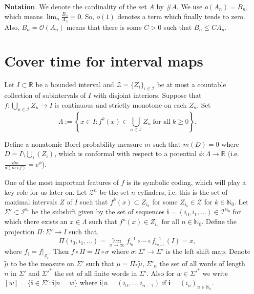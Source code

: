 \documentclass[11pt, reqno]{amsart}
\theoremstyle{plain}%
\theoremstyle{definition}
\theoremstyle{definition}
\def\R{\ensuremath{\mathbb R}}
\def\N{\ensuremath{\mathbb N}}
\def\st{such that }
\numberwithin{equation}{section}
\begin{document}
\textbf{Notation}. We denote the cardinality of the set $A$ by $\#A$. We use $o(A_n)=B_n$, which means $\lim_n \frac{B_n}{A_n}=0$. So, $o(1)$ denotes a term which finally tends to zero. Also, $B_n=\mathcal{O}(A_n)$ means that there is some $C>0$ \st $B_n\le C A_n$. 

\section{Cover time for interval maps} \label{Subsection: Cover time on Interval Maps}
Let $I\subset \R$ be a bounded interval and $\mathcal{Z}=\{Z_i\}_{i\in \mathcal{I}}$ be at most a countable collection of subintervals of $I$ with disjoint interiors. Suppose that $f:\bigcup_{n\in \mathcal{I}}Z_n\to I$ is continuous and strictly monotone on each $Z_n$. Set $$\Lambda := \left\{x \in I : f^k(x) \in \bigcup_{n\in\mathcal{I}} Z_n \;\text{for all} \;k\ge 0 \right\}.$$

 Define a nonatomic Borel probability measure $m$ such that $m(D)=0 $ where $D=I\setminus \bigcup_i(Z_i)$, which is conformal with respect to a potential $\phi:\Lambda \to \R$ (i.e. $\frac{dm}{d(m\circ f)}=e^{\phi}$).

One of the most important features of $f$ is its symbolic coding, which will play a key role for us later on. Let $\mathcal{Z}^n$ be the set $n$-cylinders, i.e. this is the set of maximal intervals $Z$ of $I$ \st $f^k(x)\subset Z_{i_k}$ for some $Z_{i_k}\in \mathcal{Z}$ for $k\in \N_0$. Let $\Sigma' \subset \mathcal{I}^{\N}$ be the subshift given by the set of sequences $\textbf{i}=(i_0,i_1,\ldots)\in \mathcal{I}^{\N_0}$ for which there exists an $x\in \Lambda$ such that $f^n(x)\in Z_{i_n}$ for all $n\in \N_0$. Define the projection $\Pi:\Sigma'\to I$ such that,
$$\Pi(i_0,i_1,\ldots)=\lim_{n\to\infty}f^{-1}_{i_0} \circ \cdots \circ f^{-1}_{i_{n-1}}(I)=x,$$ where $f_i=f|_{Z_i}$. Then $f\circ \Pi=\Pi \circ \sigma$ where $\sigma: \Sigma' \to \Sigma'$ is the left shift map.
Denote $\tilde{\mu}$ to be the measure on $\Sigma'$ such that $\mu=\Pi_*\tilde{\mu}$, $\Sigma'_n$ the set of all words of length $n$ in $\Sigma'$ and $\Sigma'^*$ the set of all finite words in $\Sigma'$. Also for $w\in\Sigma'^*$ we write $[w]=\{\textbf{i}\in\Sigma': \textbf{i}|n=w\}$ where $\textbf{i}|n=(i_0,\ldots,i_{n-1})$ if $\textbf{i}=(i_n)_{n\in\N_0}.$
\end{document}
